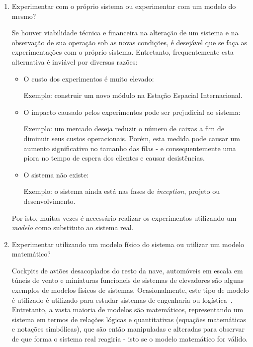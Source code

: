 \begin{enumerate}
\item Experimentar com o próprio sistema ou experimentar com um modelo do mesmo?

Se houver viabilidade técnica e financeira na alteração de um sistema e na
observação de sua operação sob as novas condições, é desejável que se faça as
experimentações com o próprio sistema. Entretanto, frequentemente esta
alternativa é inviável por diversas razões:

\begin{itemize}
  \item O custo dos experimentos é muito elevado:

  Exemplo: construir um novo módulo na Estação Espacial Internacional.

  \item O impacto causado pelos experimentos pode ser prejudicial ao sistema:

  Exemplo: um mercado deseja reduzir o número de caixas a fim de diminuir seus
custos operacionais. Porém, esta medida pode causar um aumento significativo no
tamanho das filas - e consequentemente uma piora no tempo de espera dos clientes
e causar desistências.

  \item O sistema não existe:

  Exemplo: o sistema ainda está nas fases de \textit{inception}, projeto ou
  desenvolvimento.
\end{itemize}

Por isto, muitas vezes é necessário realizar os experimentos utilizando um
\textit{modelo} como substituto ao sistema real.

\item Experimentar utilizando um modelo físico do sistema ou utilizar um modelo
matemático?

Cockpits de aviões desacoplados do resto da nave, automóveis em escala em túneis
de vento e miniaturas funcioneis de sistemas de elevadores são alguns exemplos
de modelos físicos de sistemas. Ocasionalmente, este tipo de modelo é utilizado
é utilizado para estudar sistemas de engenharia ou logística~\cite{Law}.
Entretanto, a vasta maioria de modelos são matemáticos, representando um sistema
em termos de relações lógicas e quantitativas (equações matemáticas e notações
simbólicas), que são então manipuladas e alteradas para observar de que forma o
sistema real reagiria - isto se o modelo matemático for válido.


\end{enumerate}

